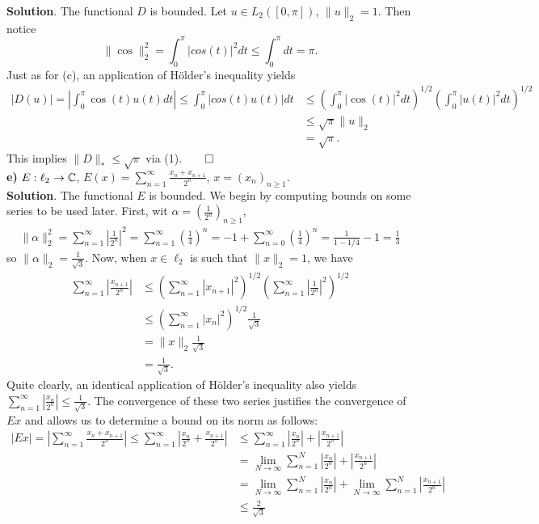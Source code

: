 \documentclass[10pt]{article}
\newcommand{\1}[1]{\mathbbm{1}_{#1}} \newcommand{\mc}[1]{\mathcal{#1}}
\begin{document}
    {\bf Solution}. The functional $D$ is bounded. Let $u\in L_2([0,\pi])$, $\|u\|_2=1$. Then notice
    \[\|\cos\|_2^2=\int_0^\pi|cos(t)|^2dt\leq \int_0^\pi dt=\pi.\]
    Just as for (c), an application of H\"older's inequality yields
    \begin{align*}
        |D(u)|=\left|\int_0^\pi\cos(t)u(t)dt\right|\leq\int_0^\pi|cos(t)u(t)|dt&\leq\left(\int_0^\pi|\cos(t)|^2dt\right)^{1/2}\left(\int_0^\pi |u(t)|^2dt\right)^{1/2}\\
        &\leq\sqrt{\pi}\|u\|_2\\
        &=\sqrt{\pi}. 
    \end{align*}
    This implies $\|D\|_\ast\leq \sqrt{\pi}$ via (1).\hfill{$\qed$}\\[5pt]
    {\bf e)} $E:\ell_2\rightarrow\mathbb{C}$, $E(x)=\sum_{n=1}^\infty\frac{x_n+x_{n+1}}{2^n}$, $x=(x_n)_{n\geq 1}$.\\[5pt]
    {\bf Solution}. The functional $E$ is bounded. We begin by computing bounds on some series to be used later. First, wit $\alpha=(\frac{1}{2^n})_{n\geq 1}$,
    \begin{align*}
        \|\alpha\|_2^2=\sum_{n=1}^\infty\left|\frac{1}{2^n}\right|^2=\sum_{n=1}^\infty\left(\frac{1}{4}\right)^n=-1+\sum_{n=0}^\infty\left(\frac{1}{4}\right)^n=\frac{1}{1-1/4}-1=\frac{1}{3}
    \end{align*}
    so $\|\alpha\|_2=\frac{1}{\sqrt{3}}$. Now, when $x\in\ell_2$ is such that $\|x\|_2=1$, we have
    \begin{align*}
        \sum_{n=1}^\infty\left|\frac{x_{n+1}}{2^n}\right|&\leq \left(\sum_{n=1}^\infty|x_{n+1}|^2\right)^{1/2}\left(\sum_{n=1}^\infty\left|\frac{1}{2^n}\right|^2\right)^{1/2}\\
        &\leq\left(\sum_{n=1}^\infty|x_n|^2\right)^{1/2}\frac{1}{\sqrt{3}}\\
        &=\|x\|_2\frac{1}{\sqrt{3}}\\
        &=\frac{1}{\sqrt{3}}\tag{2}.
    \end{align*}
    Quite clearly, an identical application of H\"older's inequality also yields $\sum_{n=1}^\infty|\frac{x_n}{2^n}|\leq\frac{1}{\sqrt{3}}$. The convergence of these two series
    justifies the convergence of $Ex$ and allows us to determine a bound on its norm as follows:
    \begin{align*}
        |Ex|=\left|\sum_{n=1}^\infty\frac{x_{n}+x_{n+1}}{2^n}\right|\leq \sum_{n=1}^\infty\left|\frac{x_n}{2^n}+\frac{x_{n+1}}{2^n}\right|&\leq \sum_{n=1}^\infty\left|\frac{x_{n}}{2^n}\right|+\left|\frac{x_{n+1}}{2^n}\right|\\
        &=\lim_{N\rightarrow\infty}\sum_{n=1}^N\left|\frac{x_{n}}{2^n}\right|+\left|\frac{x_{n+1}}{2^n}\right|\\
        &=\lim_{N\rightarrow\infty}\sum_{n=1}^N\left|\frac{x_{n}}{2^n}\right|+\lim_{N\rightarrow\infty}\sum_{n=1}^N\left|\frac{x_{n+1}}{2^n}\right|\tag{3}\\
        &\leq \frac{2}{\sqrt{3}}
    \end{align*}
\end{document}
